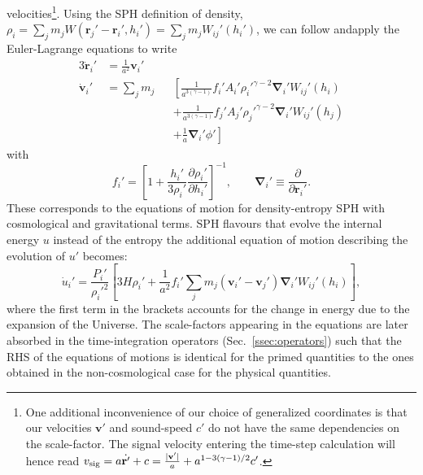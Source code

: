 velocities\footnote{One additional inconvenience of our choice of
  generalized coordinates is that our velocities $\mathbf{v}'$ and
  sound-speed $c'$ do not have the same dependencies on the
  scale-factor. The signal velocity entering the time-step calculation
  will hence read $v_{\rm sig} = a\dot{\mathbf{r}'} + c =
  \frac{|\mathbf{v}'|}{a} + a^{1-3(\gamma-1)/2}c'$.}. Using the SPH
definition of density, $\rho_i =
\sum_jm_jW(\mathbf{r}_{j}'-\mathbf{r}_{i}',h_i') =
\sum_jm_jW_{ij}'(h_i')$, we can follow \cite{Price2012} andapply the
Euler-Lagrange equations to write
\begin{alignat}{3}
  \dot{\mathbf{r}}_i'&= \frac{1}{a^2} \mathbf{v}_i'&  \label{eq:cosmo_eom_r} \\
  \dot{\mathbf{v}}_i' &= \sum_j m_j &&\left[\frac{1}{a^{3(\gamma-1)}}f_i'A_i'\rho_i'^{\gamma-2}\mathbf{\nabla}_i'W_{ij}'(h_i)\right. \nonumber\\
  &   && + \left. \frac{1}{a^{3(\gamma-1)}}f_j'A_j'\rho_j'^{\gamma-2}\mathbf{\nabla}_i'W_{ij}'(h_j)\right. \nonumber\\
  &   && + \left. \frac{1}{a}\mathbf{\nabla}_i'\phi'\right] \label{eq:cosmo_eom_v}
\end{alignat}
with
\begin{equation}
    f_i' = \left[1 + \frac{h_i'}{3\rho_i'}\frac{\partial
      \rho_i'}{\partial h_i'}\right]^{-1}, \qquad \mathbf{\nabla}_i'
  \equiv \frac{\partial}{\partial \mathbf{r}_{i}'}. \nonumber
\end{equation}
These corresponds to the equations of motion for density-entropy SPH
\citep[e.g. eq. 14 of][]{Hopkins2013} with cosmological and
gravitational terms. SPH flavours that evolve the internal energy $u$ instead of the
entropy the additional equation of motion describing the evolution of
$u'$ becomes:
\begin{equation}
  \dot{u}_i' = \frac{P_i'}{\rho_i'^2}\left[3H\rho_i' + \frac{1}{a^2}f_i'\sum_jm_j\left(\mathbf{v}_i' -
  \mathbf{v}_j'\right)\mathbf{\nabla}_i'W_{ij}'(h_i)\right],
\end{equation}
where the first term in the brackets accounts for the change in energy
due to the expansion of the Universe. The scale-factors appearing in
the equations are later absorbed in the time-integration operators
(Sec.~\ref{ssec:operators}) such that the RHS of the equations of
motions is identical for the primed quantities to the ones obtained in
the non-cosmological case for the physical quantities.

